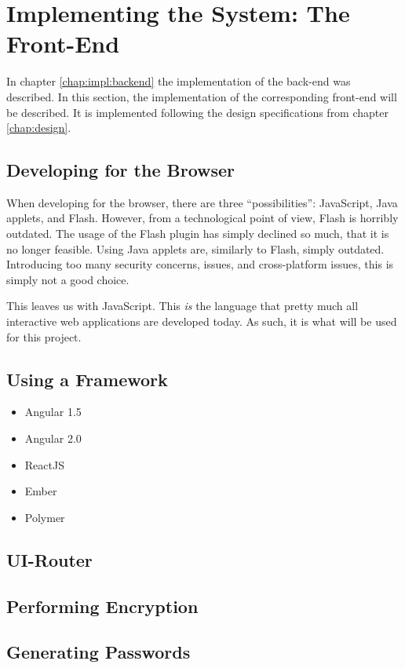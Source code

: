 \chapter{Implementing the System: The Front-End}
	In chapter \ref{chap:impl:backend} the implementation of the back-end was described. In this section, the implementation of the corresponding front-end will be described. It is implemented following the design specifications from chapter \ref{chap:design}.

	\section{Developing for the Browser}
		When developing for the browser, there are three ``possibilities'': JavaScript, Java applets, and Flash. However, from a technological point of view, Flash is horribly outdated. The usage of the Flash plugin has simply declined so much, that it is no longer feasible. Using Java applets are, similarly to Flash, simply outdated. Introducing too many security concerns, issues, and cross-platform issues, this is simply not a good choice.

		This leaves us with JavaScript. This \emph{is} the language that pretty much all interactive web applications are developed today. As such, it is what will be used for this project.


	\section{Using a Framework}
		\begin{itemize}
			\item Angular 1.5
			\item Angular 2.0
			\item ReactJS
			\item Ember
			\item Polymer
		\end{itemize}


	\section{UI-Router}
		\label{sec:impl:ui-router}

	\section{Performing Encryption}

	\section{Generating Passwords}
